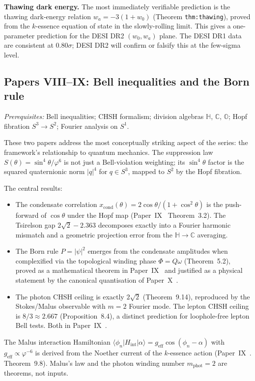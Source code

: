 \documentclass[11pt,a4paper]{article}
\newcommand{\vp}{\varphi}
\newcommand{\HH}{\mathbb{H}}
\newcommand{\CC}{\mathbb{C}}
\newcommand{\OO}{\mathbb{O}}
\newcommand{\Tsirelson}{2\sqrt{2}}
\newcommand{\xcond}{x_{\mathrm{cond}}}
\begin{document}
\textbf{Thawing dark energy.}
The most immediately verifiable prediction is the thawing dark-energy relation
$w_a = -3(1+w_0)$ (Theorem \texttt{thm:thawing}), proved from the $k$-essence
equation of state in the slowly-rolling limit. This gives a one-parameter
prediction for the DESI DR2 $(w_0, w_a)$ plane. The DESI DR1 data are
consistent at $0.80\sigma$; DESI DR2 will confirm or falsify this at the
few-sigma level.

\subsection{Papers VIII--IX: Bell inequalities and the Born rule}

\textit{Prerequisites:} Bell inequalities; CHSH formalism; division algebras
$\HH$, $\CC$, $\OO$; Hopf fibration $S^3\to S^2$; Fourier analysis on $S^1$.

These two papers address the most conceptually striking aspect of the series:
the framework's relationship to quantum mechanics. The suppression law
$S(\theta) = \sin^4\theta/\vp^6$ is not just a Bell-violation weighting; its
$\sin^4\theta$ factor is the squared quaternionic norm $|q|^4$ for $q\in S^3$,
mapped to $S^2$ by the Hopf fibration.

The central results:
\begin{itemize}[noitemsep]
\item The condensate correlation $\xcond(\theta) = 2\cos\theta/(1+\cos^2\theta)$
  is the push-forward of $\cos\theta$ under the Hopf map (Paper~IX~\cite{Paper9} Theorem~3.2).
  The Tsirelson gap $2\sqrt{2} - 2.363$ decomposes exactly into a Fourier harmonic
  mismatch and a geometric projection error from the $\HH\to\CC$ averaging.
\item The Born rule $P=|\psi|^2$ emerges from the condensate amplitudes when
  complexified via the topological winding phase $\Phi = Q\omega$ (Theorem~5.2), proved as a mathematical theorem in Paper~IX~\cite{Paper9} and
  justified as a physical statement by the canonical quantisation of Paper~X~\cite{Paper10}.
\item The photon CHSH ceiling is exactly $\Tsirelson$ (Theorem~9.14),
  reproduced by the Stokes/Malus observable with $m=2$ Fourier mode.
  The lepton CHSH ceiling is $8/3 \approx 2.667$ (Proposition~8.4),
  a distinct prediction for loophole-free lepton Bell tests. Both in Paper~IX~\cite{Paper9}.
\end{itemize}

The Malus interaction Hamiltonian
$\langle\phi_n|H_{\mathrm{int}}|\alpha\rangle = g_{\mathrm{eff}}\cos(\phi_n-\alpha)$
with $g_{\mathrm{eff}} \propto \vp^{-6}$ is derived from the Noether current of the
$k$-essence action (Paper~IX~\cite{Paper9}. Theorem~9.8). Malus's law and the photon winding
number $m_{\mathrm{phot}}=2$ are theorems, not inputs.
\end{document}

